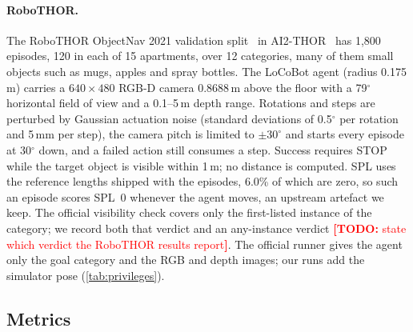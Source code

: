 \documentclass[10pt]{article}
\newcommand{\TODO}[1]{\textcolor{red}{\textbf{[TODO:} #1\textbf{]}}}
\newcommand{\SPL}{\textsc{SPL}\xspace}
\begin{document}
\paragraph{RoboTHOR.} The RoboTHOR ObjectNav 2021 validation split~\citep{deitke2020robothor} in
AI2-THOR~\citep{kolve2017ai2} has 1,800 episodes, 120 in each of 15 apartments, over 12 categories, many of them small
objects such as mugs, apples and spray bottles. The LoCoBot agent (radius 0.175\,m) carries a $640\times480$ RGB-D
camera 0.8688\,m above the floor with a 79$^\circ$ horizontal field of view and a 0.1--5\,m depth range. Rotations
and steps are perturbed by Gaussian actuation noise (standard deviations of 0.5$^\circ$ per rotation and 5\,mm per
step), the camera pitch is limited to $\pm30^\circ$ and starts every episode at 30$^\circ$ down, and a failed action
still consumes a step. Success requires STOP while the target object
is visible within 1\,m; no distance is computed. \SPL uses the reference lengths shipped with the episodes, 6.0\% of
which are zero, so such an episode scores \SPL~0 whenever the agent moves, an upstream artefact we keep. The official
visibility check covers only the first-listed instance of the category; we record both that verdict and an
any-instance verdict \TODO{state which verdict the RoboTHOR results report}. The official runner gives the agent only
the goal category and the RGB and depth images; our runs add the simulator pose (\cref{tab:privileges}).

\subsection{Metrics}\label{sec:experiments-metrics}
\end{document}
